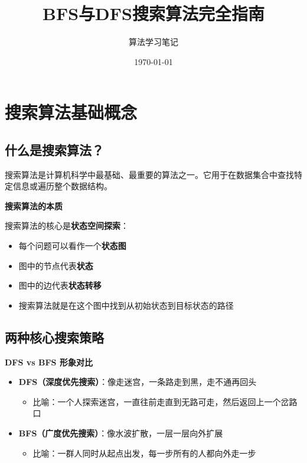 \documentclass[12pt,a4paper]{article}
\title{\Huge \textbf{BFS与DFS搜索算法完全指南}}
\author{算法学习笔记}
\date{\today}
\begin{document}
	
	\maketitle
	
	\tableofcontents
	\newpage
	
	\section{搜索算法基础概念}
	
	\subsection{什么是搜索算法？}
	
	搜索算法是计算机科学中最基础、最重要的算法之一。它用于在数据集合中查找特定信息或遍历整个数据结构。
	
	\begin{bluebox}
		\textbf{搜索算法的本质}
		
		搜索算法的核心是\textbf{状态空间探索}：
		\begin{itemize}
			\item 每个问题可以看作一个\textbf{状态图}
			\item 图中的节点代表\textbf{状态}
			\item 图中的边代表\textbf{状态转移}
			\item 搜索算法就是在这个图中找到从初始状态到目标状态的路径
		\end{itemize}
	\end{bluebox}
	
	\subsection{两种核心搜索策略}
	
	\begin{yellowbox}
		\textbf{DFS vs BFS 形象对比}
		
		\begin{itemize}
			\item \textbf{DFS（深度优先搜索）}：像走迷宫，一条路走到黑，走不通再回头
			\begin{itemize}
				\item 比喻：一个人探索迷宫，一直往前走直到无路可走，然后返回上一个岔路口
			\end{itemize}
			\item \textbf{BFS（广度优先搜索）}：像水波扩散，一层一层向外扩展
			\begin{itemize}
				\item 比喻：一群人同时从起点出发，每一步所有的人都向外走一步
			\end{itemize}
		\end{itemize}
	\end{yellowbox}
	
\end{document}
